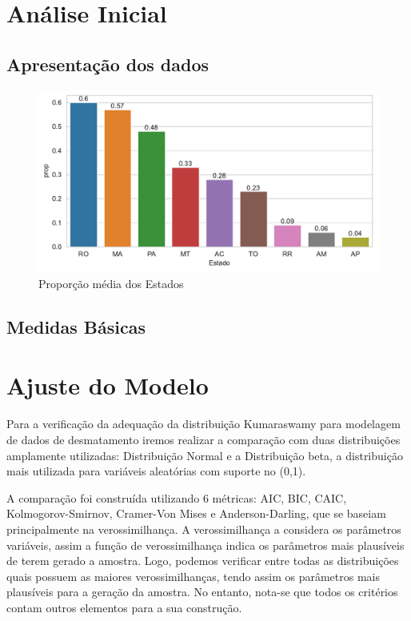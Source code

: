 \documentclass[
]{article}
\begin{document}
\section{\centering Análise Inicial}

\subsection{Apresentação dos dados}

\begin{figure}

{\centering \includegraphics{report_files/figure-pdf/fig-states-output-1.pdf}

}

\caption{\label{fig-states}Proporção média dos Estados}

\end{figure}

\subsection{Medidas Básicas}

\section{\centering Ajuste do Modelo}

Para a verificação da adequação da distribuição Kumaraswamy para
modelagem de dados de desmatamento iremos realizar a comparação com duas
distribuições amplamente utilizadas: Distribuição Normal e a
Distribuição beta, a distribuição mais utilizada para variáveis
aleatórias com suporte no (0,1).

A comparação foi construída utilizando 6 métricas: AIC, BIC, CAIC,
Kolmogorov-Smirnov, Cramer-Von Mises e Anderson-Darling, que se baseiam
principalmente na verossimilhança. A verossimilhança a considera os
parâmetros variáveis, assim a função de verossimilhança indica os
parâmetros mais plausíveis de terem gerado a amostra. Logo, podemos
verificar entre todas as distribuições quais possuem as maiores
verossimilhanças, tendo assim os parâmetros mais plausíveis para a
geração da amostra. No entanto, nota-se que todos os critérios contam
outros elementos para a sua construção.
\end{document}
